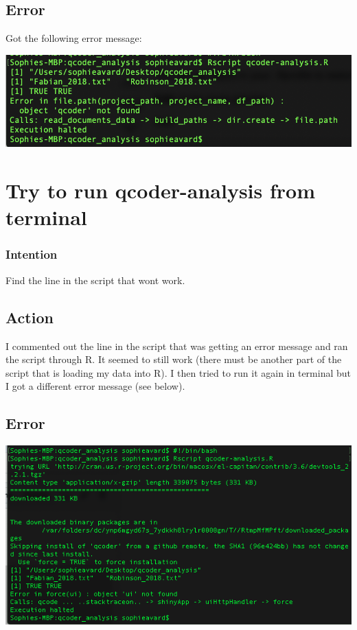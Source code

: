 \documentclass{article}
\begin{document}
\subsection{Error}
Got the following error message:

\includegraphics[width=\textwidth]{qcoder-terminal-error.png}

\section{Try to run qcoder-analysis from terminal}

\subsubsection{Intention}
Find the line in the script that wont work.

\subsection{Action}
I commented out the line in the script that was getting an error message and ran the script through R. It seemed to still work (there must be another part of the script that is loading my data into R). I then tried to run it again in terminal but I got a different error message (see below).

\subsection{Error}
\includegraphics[width=\textwidth]{ui.png}
\end{document}
